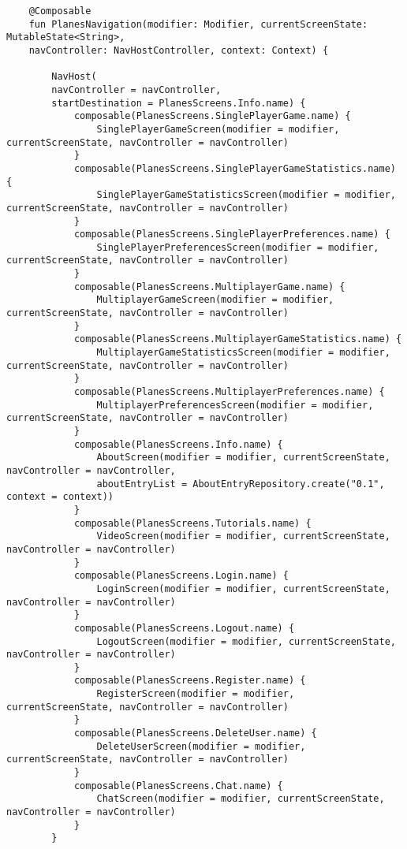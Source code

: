 \begin{lstlisting}
	@Composable
	fun PlanesNavigation(modifier: Modifier, currentScreenState: MutableState<String>,
	navController: NavHostController, context: Context) {
		
		NavHost(
		navController = navController,
		startDestination = PlanesScreens.Info.name) {
			composable(PlanesScreens.SinglePlayerGame.name) {
				SinglePlayerGameScreen(modifier = modifier, currentScreenState, navController = navController)
			}
			composable(PlanesScreens.SinglePlayerGameStatistics.name) {
				SinglePlayerGameStatisticsScreen(modifier = modifier, currentScreenState, navController = navController)
			}
			composable(PlanesScreens.SinglePlayerPreferences.name) {
				SinglePlayerPreferencesScreen(modifier = modifier, currentScreenState, navController = navController)
			}
			composable(PlanesScreens.MultiplayerGame.name) {
				MultiplayerGameScreen(modifier = modifier, currentScreenState, navController = navController)
			}
			composable(PlanesScreens.MultiplayerGameStatistics.name) {
				MultiplayerGameStatisticsScreen(modifier = modifier, currentScreenState, navController = navController)
			}
			composable(PlanesScreens.MultiplayerPreferences.name) {
				MultiplayerPreferencesScreen(modifier = modifier, currentScreenState, navController = navController)
			}
			composable(PlanesScreens.Info.name) {
				AboutScreen(modifier = modifier, currentScreenState, navController = navController,
				aboutEntryList = AboutEntryRepository.create("0.1", context = context))
			}
			composable(PlanesScreens.Tutorials.name) {
				VideoScreen(modifier = modifier, currentScreenState, navController = navController)
			}
			composable(PlanesScreens.Login.name) {
				LoginScreen(modifier = modifier, currentScreenState, navController = navController)
			}
			composable(PlanesScreens.Logout.name) {
				LogoutScreen(modifier = modifier, currentScreenState, navController = navController)
			}
			composable(PlanesScreens.Register.name) {
				RegisterScreen(modifier = modifier, currentScreenState, navController = navController)
			}
			composable(PlanesScreens.DeleteUser.name) {
				DeleteUserScreen(modifier = modifier, currentScreenState, navController = navController)
			}
			composable(PlanesScreens.Chat.name) {
				ChatScreen(modifier = modifier, currentScreenState, navController = navController)
			}
		}
\end{lstlisting}